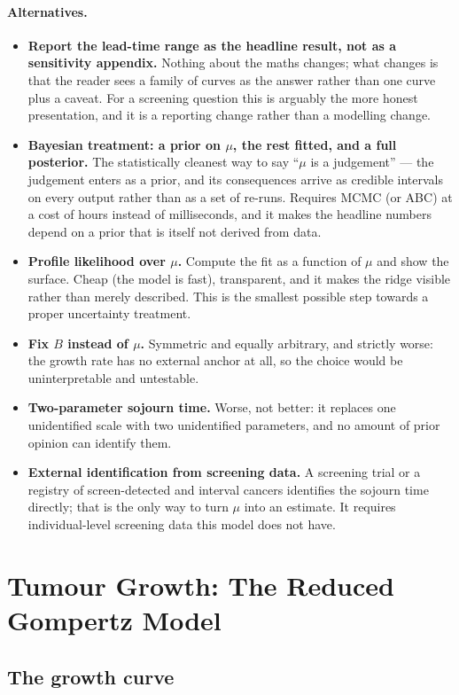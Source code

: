 \documentclass[12pt,a4paper]{article}
\newcommand{\alt}[1]{\paragraph{Alternatives.} #1}
\begin{document}
\alt{\begin{itemize}[nosep]
  \item \textbf{Report the lead-time range as the headline result, not as a sensitivity appendix.} Nothing
        about the maths changes; what changes is that the reader sees a family of curves as the answer
        rather than one curve plus a caveat. For a screening question this is arguably the more honest
        presentation, and it is a reporting change rather than a modelling change.
  \item \textbf{Bayesian treatment: a prior on $\mu$, the rest fitted, and a full posterior.} The
        statistically cleanest way to say ``$\mu$ is a judgement'' --- the judgement enters as a prior,
        and its consequences arrive as credible intervals on every output rather than as a set of
        re-runs. Requires MCMC (or ABC) at a cost of hours instead of milliseconds, and it makes the
        headline numbers depend on a prior that is itself not derived from data.
  \item \textbf{Profile likelihood over $\mu$.} Compute the fit as a function of $\mu$ and show the
        surface. Cheap (the model is fast), transparent, and it makes the ridge visible rather than
        merely described. This is the smallest possible step towards a proper uncertainty treatment.
  \item \textbf{Fix $B$ instead of $\mu$.} Symmetric and equally arbitrary, and strictly worse: the growth
        rate has no external anchor at all, so the choice would be uninterpretable and untestable.
  \item \textbf{Two-parameter sojourn time.} Worse, not better: it replaces one unidentified scale with
        two unidentified parameters, and no amount of prior opinion can identify them.
  \item \textbf{External identification from screening data.} A screening trial or a registry of
        screen-detected and interval cancers identifies the sojourn time directly; that is the only way to
        turn $\mu$ into an estimate. It requires individual-level screening data this model does not have.
\end{itemize}}

\section{Tumour Growth: The Reduced Gompertz Model}
\label{sec:gompertz}

\subsection{The growth curve}
\end{document}
